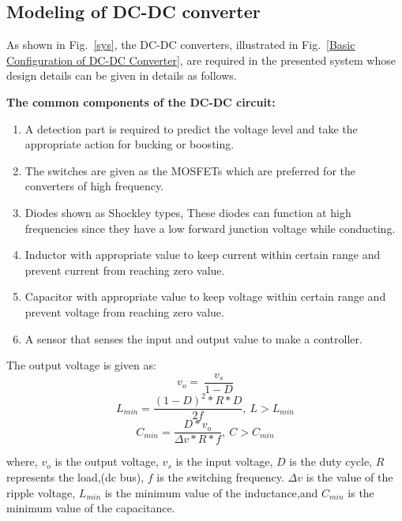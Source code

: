 \documentclass[conference]{IEEEtran}
\begin{document}
\subsection{Modeling of DC-DC converter}
As shown in Fig.~\ref{sys}, the DC-DC converters, illustrated in Fig.~\ref{Basic Configuration of DC-DC Converter}, are required in the presented system whose design details can be given in details as follows.


\textbf{The common components of the DC-DC circuit:}

\begin{enumerate}
	\item A detection part is required to predict the voltage level and take the appropriate action for bucking or boosting.
	\item The switches are given as the MOSFETs which are preferred for the converters of high frequency.
	\item Diodes shown as Shockley types, These diodes can function at high frequencies since they have a low forward junction voltage while conducting.
	\item Inductor with appropriate value to keep current within certain range and prevent current from reaching zero value.
	\item Capacitor with appropriate value to keep voltage within certain range and prevent voltage from reaching zero value.
	\item A sensor that senses the input and output value to make a controller.
\end{enumerate}
The output voltage is given as:
\begin{equation}
	v_o=\ \frac{v_s}{1-D}\label{V0}
\end{equation}
\begin{equation}
	L_{min}=\frac{(1-D)^2 * R * D}{2f},\ L>L_{min}\label{lmin}
\end{equation}
\begin{equation}
	C_{min}=\frac{D*v_o}{\Delta v* R * f},\ C>C_{min}\label{cmin}
\end{equation}

where, $v_o$ is the output voltage, $v_s$ is the input voltage, $D$ is the duty cycle, $R$  represents the load,(dc bus), $f$ is the switching frequency. $\Delta v$ is the value of the ripple voltage, $L_{min}$ is the minimum value of the inductance,and $C_{min}$ is the minimum value of the capacitance.
\end{document}
